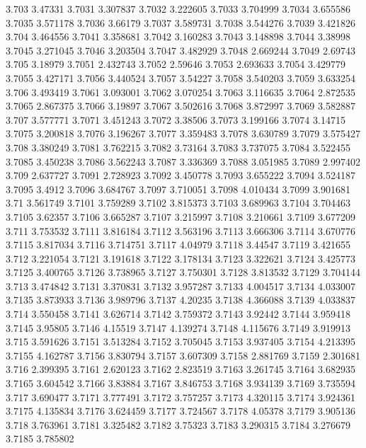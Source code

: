 3.703  3.47331
3.7031  3.307837
3.7032  3.222605
3.7033  3.704999
3.7034  3.655586
3.7035  3.571178
3.7036  3.66179
3.7037  3.589731
3.7038  3.544276
3.7039  3.421826
3.704  3.464556
3.7041  3.358681
3.7042  3.160283
3.7043  3.148898
3.7044  3.38998
3.7045  3.271045
3.7046  3.203504
3.7047  3.482929
3.7048  2.669244
3.7049  2.69743
3.705  3.18979
3.7051  2.432743
3.7052  2.59646
3.7053  2.693633
3.7054  3.429779
3.7055  3.427171
3.7056  3.440524
3.7057  3.54227
3.7058  3.540203
3.7059  3.633254
3.706  3.493419
3.7061  3.093001
3.7062  3.070254
3.7063  3.116635
3.7064  2.872535
3.7065  2.867375
3.7066  3.19897
3.7067  3.502616
3.7068  3.872997
3.7069  3.582887
3.707  3.577771
3.7071  3.451243
3.7072  3.38506
3.7073  3.199166
3.7074  3.14715
3.7075  3.200818
3.7076  3.196267
3.7077  3.359483
3.7078  3.630789
3.7079  3.575427
3.708  3.380249
3.7081  3.762215
3.7082  3.73164
3.7083  3.737075
3.7084  3.522455
3.7085  3.450238
3.7086  3.562243
3.7087  3.336369
3.7088  3.051985
3.7089  2.997402
3.709  2.637727
3.7091  2.728923
3.7092  3.450778
3.7093  3.655222
3.7094  3.524187
3.7095  3.4912
3.7096  3.684767
3.7097  3.710051
3.7098  4.010434
3.7099  3.901681
3.71  3.561749
3.7101  3.759289
3.7102  3.815373
3.7103  3.689963
3.7104  3.704463
3.7105  3.62357
3.7106  3.665287
3.7107  3.215997
3.7108  3.210661
3.7109  3.677209
3.711  3.753532
3.7111  3.816184
3.7112  3.563196
3.7113  3.666306
3.7114  3.670776
3.7115  3.817034
3.7116  3.714751
3.7117  4.04979
3.7118  3.44547
3.7119  3.421655
3.712  3.221054
3.7121  3.191618
3.7122  3.178134
3.7123  3.322621
3.7124  3.425773
3.7125  3.400765
3.7126  3.738965
3.7127  3.750301
3.7128  3.813532
3.7129  3.704144
3.713  3.474842
3.7131  3.370831
3.7132  3.957287
3.7133  4.004517
3.7134  4.033007
3.7135  3.873933
3.7136  3.989796
3.7137  4.20235
3.7138  4.366088
3.7139  4.033837
3.714  3.550458
3.7141  3.626714
3.7142  3.759372
3.7143  3.92442
3.7144  3.959418
3.7145  3.95805
3.7146  4.15519
3.7147  4.139274
3.7148  4.115676
3.7149  3.919913
3.715  3.591626
3.7151  3.513284
3.7152  3.705045
3.7153  3.937405
3.7154  4.213395
3.7155  4.162787
3.7156  3.830794
3.7157  3.607309
3.7158  2.881769
3.7159  2.301681
3.716  2.399395
3.7161  2.620123
3.7162  2.823519
3.7163  3.261745
3.7164  3.682935
3.7165  3.604542
3.7166  3.83884
3.7167  3.846753
3.7168  3.934139
3.7169  3.735594
3.717  3.690477
3.7171  3.777491
3.7172  3.757257
3.7173  4.320115
3.7174  3.924361
3.7175  4.135834
3.7176  3.624459
3.7177  3.724567
3.7178  4.05378
3.7179  3.905136
3.718  3.763961
3.7181  3.325482
3.7182  3.75323
3.7183  3.290315
3.7184  3.276679
3.7185  3.785802
